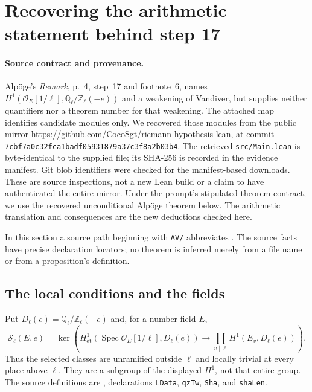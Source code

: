 \section{Recovering the arithmetic statement behind step 17}
\label{sec:step17}

\paragraph{Source contract and provenance.}
Alp\"oge's \emph{Remark}, p.~4, step~17 and footnote~6, names
$H^1(\mathcal O_E[1/\ell],\mathbb Q_\ell/\mathbb Z_\ell(-e))$
and a weakening of Vandiver, but supplies neither quantifiers nor a theorem
number for that weakening. The attached map identifies candidate modules only.
We recovered those modules from the public mirror
\url{https://github.com/CocoSgt/riemann-hypothesis-lean}, at commit
\texttt{7cbf7a0c32fca1badf05931879a37c3f8a2b03b4}.
The retrieved \texttt{src/Main.lean} is byte-identical to the supplied file;
its SHA-256 is recorded in the evidence manifest. Git blob identifiers were
checked for the manifest-based downloads. These are source inspections, not
a new Lean build or a claim to have authenticated the entire mirror. Under
the prompt's stipulated theorem contract, we use the recovered unconditional
Alp\"oge theorem below. The arithmetic translation and consequences are the
new deductions checked here.

In this section a source path beginning with \texttt{AV/} abbreviates
.
The source facts have precise declaration locators; no theorem is inferred
merely from a file name or from a proposition's definition.

\subsection{The local conditions and the fields}

Put $D_\ell(e)=\mathbb Q_\ell/\mathbb Z_\ell(-e)$ and, for a number field $E$,
\[
 \mathcal S_\ell(E,e)=
 \ker\left(H^1_{\mathrm{et}}(\operatorname{Spec}\mathcal O_E[1/\ell],D_\ell(e))
       \longrightarrow\prod_{v\mid\ell}H^1(E_v,D_\ell(e))\right).
 \tag{S1}
\]
Thus the selected classes are unramified outside $\ell$ and locally trivial
at every place above $\ell$. They are a subgroup of the displayed $H^1$,
not that entire group. The source definitions are
, declarations
\texttt{LData}, \texttt{qzTw}, \texttt{Sha}, and \texttt{shaLen}.

